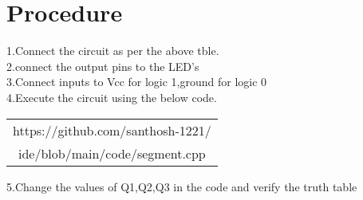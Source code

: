 \documentclass[journal,12pt]{article}
\begin{document}
\section{Procedure}
\begin{raggedright}
    1.Connect the circuit as per the above tble.\\
    2.connect the output pins to the LED's \\
    3.Connect inputs to Vcc for logic 1,ground for logic 0 \\
    4.Execute the circuit using the below code.\\
\begin{table}[h]
\centering
	\begin{tabular}{|c|}
	\hline
	https://github.com/santhosh-1221/ \\
		ide/blob/main/code/segment.cpp \\
	\hline
\end{tabular}
\end{table}
     5.Change the values of Q1,Q2,Q3 in the code and verify the truth table \\
\end{raggedright}

\end{document}
